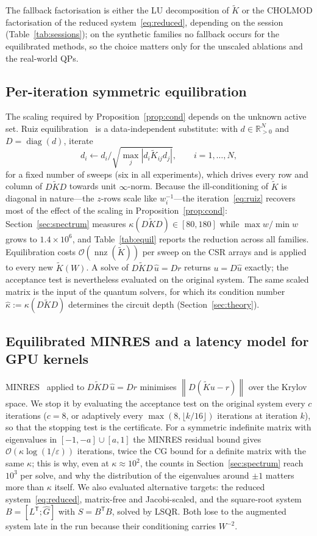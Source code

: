 \documentclass[11pt]{article}
\theoremstyle{definition}
\newcommand{\R}{\mathbb{R}}
\newcommand{\norm}[1]{\left\lVert #1 \right\rVert}
\newcommand{\Kt}{\tilde K}
\newcommand{\kh}{\hat\kappa}
\newcommand{\eps}{\varepsilon}
\newcommand{\Ghat}{\hat G}
\newcommand{\T}{^{\mathsf T}}
\newcommand{\bigO}{\mathcal{O}}
\newcommand{\nnz}{\operatorname{nnz}}
\begin{document}
The fallback factorisation is either the LU decomposition of $\Kt$ or the CHOLMOD factorisation of the reduced system~\eqref{eq:reduced}, depending on the session (Table~\ref{tab:sessions}); on the synthetic families no fallback occurs for the equilibrated methods, so the choice matters only for the unscaled ablations and the real-world QPs.

\subsection{Per-iteration symmetric equilibration}\label{sec:equil}
The scaling required by Proposition~\ref{prop:cond} depends on the unknown active set. Ruiz equilibration~\cite{ruiz2001scaling,knight2014symmetry} is a data-independent substitute: with $d\in\R^N_{>0}$ and $D=\operatorname{diag}(d)$, iterate
\begin{equation}\label{eq:ruiz}
d_i \leftarrow d_i\Big/\sqrt{\max_j |d_i \Kt_{ij} d_j|},\qquad i=1,\dots,N,
\end{equation}
for a fixed number of sweeps (six in all experiments), which drives every row and column of $D\Kt D$ towards unit $\infty$-norm. Because the ill-conditioning of $\Kt$ is diagonal in nature---the $z$-rows scale like $w_i^{-1}$---the iteration~\eqref{eq:ruiz} recovers most of the effect of the scaling in Proposition~\ref{prop:cond}: Section~\ref{sec:spectrum} measures $\kappa(D\Kt D)\in[80,180]$ while $\max w/\min w$ grows to $1.4\times10^{6}$, and Table~\ref{tab:equil} reports the reduction across all families. Equilibration costs $\bigO(\nnz(\Kt))$ per sweep on the CSR arrays and is applied to every new $\Kt(W)$. A solve of $D\Kt D\,\hat u=Dr$ returns $u=D\hat u$ exactly; the acceptance test is nevertheless evaluated on the original system. The same scaled matrix is the input of the quantum solvers, for which its condition number $\kh:=\kappa(D\Kt D)$ determines the circuit depth (Section~\ref{sec:theory}).

\subsection{Equilibrated MINRES and a latency model for GPU kernels}\label{sec:minres}
MINRES~\cite{paige1975minres} applied to $D\Kt D\,\hat u=Dr$ minimises $\norm{D(\Kt u-r)}$ over the Krylov space. We stop it by evaluating the acceptance test on the original system every $c$ iterations ($c=8$, or adaptively every $\max(8,\lfloor k/16\rfloor)$ iterations at iteration $k$), so that the stopping test is the certificate. For a symmetric indefinite matrix with eigenvalues in $[-1,-a]\cup[a,1]$ the MINRES residual bound gives $\bigO(\kappa\log(1/\eps))$ iterations, twice the CG bound for a definite matrix with the same $\kappa$; this is why, even at $\kappa\approx10^{2}$, the counts in Section~\ref{sec:spectrum} reach $10^{3}$ per solve, and why the distribution of the eigenvalues around $\pm1$ matters more than $\kappa$ itself. We also evaluated alternative targets: the reduced system~\eqref{eq:reduced}, matrix-free and Jacobi-scaled, and the square-root system $B=[L\T;\Ghat]$ with $S=B\T B$, solved by LSQR. Both lose to the augmented system late in the run because their conditioning carries $W^{-2}$.
\end{document}
